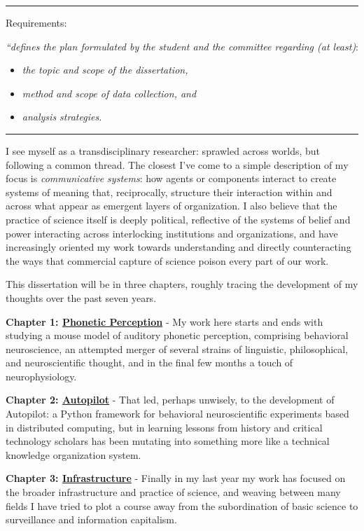 
\hrule
\vspace{1em}

Requirements: 

\textit{``defines the plan formulated by the student and the committee regarding (at least)}:

\begin{itemize}
\item \textit{the topic and scope of the dissertation,}
\item \textit{method and scope of data collection, and}
\item \textit{analysis strategies.}
\end{itemize}

\vspace{1em}
\hrule
\vspace{2em}

I see myself as a transdisciplinary researcher: sprawled across worlds, but following a common thread. The closest I've come to a simple description of my focus is \textit{communicative systems}: how agents or components interact to create systems of meaning that, reciprocally, structure their interaction within and across what appear as emergent layers of organization. I also believe that the practice of science itself is deeply political, reflective of the systems of belief and power interacting across interlocking institutions and organizations, and have increasingly oriented my work towards understanding and directly counteracting the ways that commercial capture of science poison every part of our work.

This dissertation will be in three chapters, roughly tracing the development of my thoughts over the past seven years.

\textbf{Chapter 1: \hyperref[sec:phonemes]{Phonetic Perception}} - My work here starts and ends with studying a mouse model of auditory phonetic perception, comprising behavioral neuroscience, an attempted merger of several strains of linguistic, philosophical, and neuroscientific thought, and in the final few months a touch of neurophysiology. 

\textbf{Chapter 2: \hyperref[sec:autopilot]{Autopilot}} - That led, perhaps unwisely, to the development of Autopilot: a Python framework for behavioral neuroscientific experiments based in distributed computing, but in learning lessons from history and critical technology scholars has been mutating into something more like a technical knowledge organization system. 

\textbf{Chapter 3: \hyperref[sec:infrastructure]{Infrastructure}} - Finally in my last year my work has focused on the broader infrastructure and practice of science, and weaving between many fields I have tried to plot a course away from the subordination of basic science to surveillance and information capitalism. 

